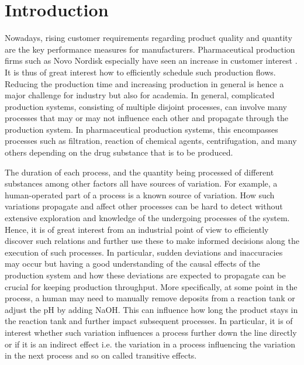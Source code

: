 \documentclass[../Thesis.tex]{subfiles}
\begin{document}

\chapter{Introduction}

Nowadays, rising customer requirements regarding product quality and quantity are the key performance measures for manufacturers. Pharmaceutical production firms such as Novo Nordisk especially have seen an increase in customer interest \cite{NOVO_Wegovy_update}. It is thus of great interest how to efficiently schedule such production flows. Reducing the production time and increasing production in general is hence a major challenge for industry but also for academia. In general, complicated production systems, consisting of multiple disjoint processes, can involve many processes that may or may not influence each other and propagate through the production system. In pharmaceutical production systems, this encompasses processes such as filtration, reaction of chemical agents, centrifugation, and many others depending on the drug substance that is to be produced.


The duration of each process, and the quantity being processed of different substances among other factors all have sources of variation. For example, a human-operated part of a process is a known source of variation. How such variations propagate and affect other processes can be hard to detect without extensive exploration and knowledge of the undergoing processes of the system. Hence, it is of great interest from an industrial point of view to efficiently discover such relations and further use these to make informed decisions along the execution of such processes. In particular, sudden deviations and inaccuracies may occur but having a good understanding of the causal effects of the production system and how these deviations are expected to propagate can be crucial for keeping production throughput. More specifically, at some point in the process, a human may need to manually remove deposits from a reaction tank or adjust the pH by adding NaOH. This can influence how long the product stays in the reaction tank and further impact subsequent processes. In particular, it is of interest whether such variation influences a process further down the line directly or if it is an indirect effect i.e. the variation in a process influencing the variation in the next process and so on called transitive effects.
\end{document}
